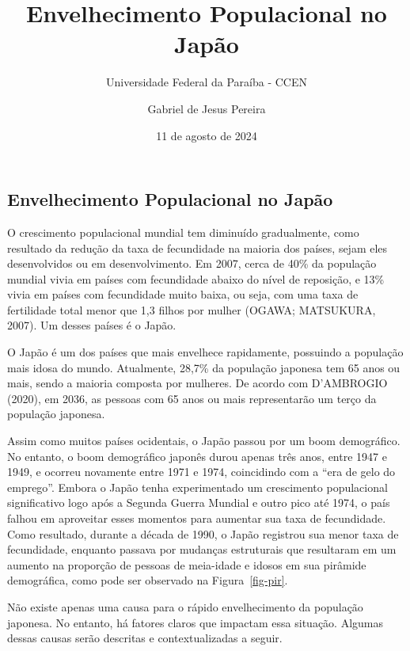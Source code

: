 \documentclass[
  12pt,
  letterpaper,
  DIV=11,
  numbers=noendperiod]{scrartcl}
\title{Envelhecimento Populacional no Japão}
\subtitle{Universidade Federal da Paraíba - CCEN}
\author{Gabriel de Jesus Pereira}
\date{11 de agosto de 2024}
\begin{document}
\maketitle

\subsection{Envelhecimento Populacional no
Japão}\label{envelhecimento-populacional-no-japuxe3o}

O crescimento populacional mundial tem diminuído gradualmente, como
resultado da redução da taxa de fecundidade na maioria dos países, sejam
eles desenvolvidos ou em desenvolvimento. Em 2007, cerca de 40\% da
população mundial vivia em países com fecundidade abaixo do nível de
reposição, e 13\% vivia em países com fecundidade muito baixa, ou seja,
com uma taxa de fertilidade total menor que 1,3 filhos por mulher
(OGAWA; MATSUKURA, 2007). Um desses países é o Japão.

\vspace{12pt}

O Japão é um dos países que mais envelhece rapidamente, possuindo a
população mais idosa do mundo. Atualmente, 28,7\% da população japonesa
tem 65 anos ou mais, sendo a maioria composta por mulheres. De acordo
com D'AMBROGIO (2020), em 2036, as pessoas com 65 anos ou mais
representarão um terço da população japonesa.

\vspace{12pt}

Assim como muitos países ocidentais, o Japão passou por um boom
demográfico. No entanto, o boom demográfico japonês durou apenas três
anos, entre 1947 e 1949, e ocorreu novamente entre 1971 e 1974,
coincidindo com a ``era de gelo do emprego''. Embora o Japão tenha
experimentado um crescimento populacional significativo logo após a
Segunda Guerra Mundial e outro pico até 1974, o país falhou em
aproveitar esses momentos para aumentar sua taxa de fecundidade. Como
resultado, durante a década de 1990, o Japão registrou sua menor taxa de
fecundidade, enquanto passava por mudanças estruturais que resultaram em
um aumento na proporção de pessoas de meia-idade e idosos em sua
pirâmide demográfica, como pode ser observado na Figura~\ref{fig-pir}.

\vspace{12pt}

Não existe apenas uma causa para o rápido envelhecimento da população
japonesa. No entanto, há fatores claros que impactam essa situação.
Algumas dessas causas serão descritas e contextualizadas a seguir.
\end{document}

